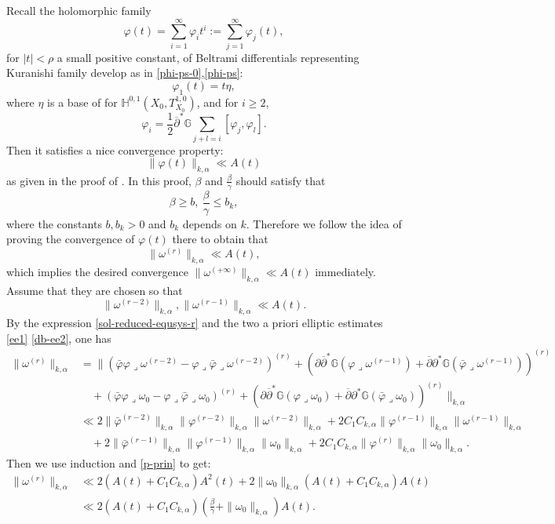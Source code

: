 \documentclass[12pt]{amsart}
\numberwithin{equation}{section}
\renewcommand{\1}{\mathds{1}}
\newcommand{\G}{\mathbb{G}}
\newcommand{\db}{\overline{\partial}}
\renewcommand{\>}{\rightarrow}
\newcommand{\p}{\partial}
\def\p{\partial}
\def\b{\bar}
\def\l{\lrcorner}
\begin{document}
Recall the holomorphic family
\begin{equation}\label{phi-ps-p}
\varphi(t) = \sum_{i=1}^{\infty}\varphi_{i}t^i:=\sum_{j=1}^{\infty}\varphi_j(t),
\end{equation}
{for $|t|< \rho$ a small positive constant,} of Beltrami differentials representing Kuranishi family develop as in \eqref{phi-ps-0},\eqref{phi-ps}:
$$
 \varphi_1(t)=t\eta,
$$
where $\eta$ is a base of for $\mathbb{H}^{0,1}(X_0,T^{1,0}_{X_0})$, and for $i\geq 2$,
$$
  \varphi_i=\frac{1}{2}\db^*\G\sum_{j+l=i}[\varphi_j,\varphi_{l}].
$$
Then it satisfies a nice convergence property:
$$\|\varphi(t)\|_{k, \alpha}\ll A(t)$$
as given in the proof of \cite[Proposition 2.4 in Chapter $4$]{MK}.
In this proof, $\beta$ and $\frac{\beta}{\gamma}$ should satisfy
that
\begin{equation}\label{initial-bg}
\beta\geq b,\ \frac{\beta}{\gamma}\leq b_k,
\end{equation}
where the constants $b,b_k>0$ and $b_k$ depends on $k$.
 Therefore we follow the idea of proving the
convergence of $\varphi(t)$ there to obtain that
$$\|\omega^{(r)}\|_{k, \alpha}\ll A(t),$$
which implies the desired convergence $\|\omega^{(+\infty)}\|_{k,
\alpha}\ll A(t)$ immediately.
 Assume that they are chosen so that $$\|\omega^{(r-2)}\|_{k, \alpha},\|\omega^{(r-1)}\|_{k, \alpha}\ll A(t).$$
By the expression \eqref{sol-reduced-equsys-r} and the two a priori
elliptic estimates \eqref{ee1} \eqref{db-ee2}, one has
\begin{align*}
\|\omega^{(r)}\|_{k, \alpha}
 &=\|(\b{\varphi}\varphi\l\omega^{(r-2)}-\varphi\l\b{\varphi}\l\omega^{(r-2)})^{(r)}+\left(\p\db^*\G(\varphi\l\omega^{(r-1)})+\db\p^*\G(\b{\varphi}\l\omega^{(r-1)})\right)^{(r)}\\
 &\quad +(\b{\varphi}\varphi\l\omega_0-\varphi\l\b{\varphi}\l\omega_0)^{(r)}+\left(\p\db^*\G(\varphi\l\omega_0)+\db\p^*\G(\b{\varphi}\l\omega_0)\right)^{(r)}\|_{k, \alpha}\\
 &\ll 2\|\b{\varphi}^{(r-2)}\|_{k, \alpha}\|\varphi^{(r-2)}\|_{k, \alpha}\|\omega^{(r-2)}\|_{k, \alpha}
 +2 C_1C_{k,\alpha}\|\varphi^{(r-1)}\|_{k, \alpha}\|\omega^{(r-1)}\|_{k, \alpha}\\
 &\quad + 2\|\b{\varphi}^{(r-1)}\|_{k, \alpha}\|\varphi^{(r-1)}\|_{k, \alpha}\|\omega_0\|_{k, \alpha}
 +2 C_1C_{k,\alpha}\|\varphi^{(r)}\|_{k, \alpha}\|\omega_0\|_{k,
 \alpha}.
\end{align*}
Then we use induction and \eqref{p-prin} to get:
\begin{align*}
\|\omega^{(r)}\|_{k, \alpha}
 &\ll 2(A(t)+C_1C_{k,\alpha})A^2(t)+2\|\omega_0\|_{k,\alpha}(A(t)+C_1C_{k,\alpha})A(t)\\
 &\ll
 2(A(t)+C_1C_{k,\alpha})\left(\frac{\beta}{\gamma}+\|\omega_0\|_{k,\alpha}\right)A(t).
\end{align*}
\end{document}
